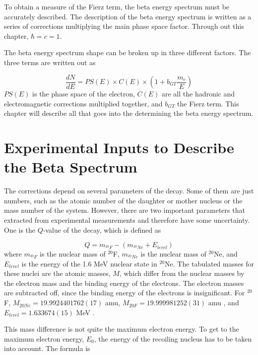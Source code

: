 \documentclass[../MaxHughesThesis.tex]{subfiles}
\begin{document}
To obtain a measure of the Fierz term, the beta energy spectrum must be accurately described.
The description of the beta energy spectrum is written as a series of corrections multiplying the main phase space factor.  
Through out this chapter, $\hbar = c = 1$.

The beta energy spectrum shape can be broken up in three different factors. 
The three terms are written out as  %

\begin{equation}
	\frac{dN}{dE} = PS(E) \times C(E) \times (1 + b_{GT}\frac{m_{e}}{E})
	\label{eq:betaspectrum}
\end{equation}
$PS(E)$ is the phase space of the electron, $C(E)$ are all the hadronic and electromagnetic corrections multiplied together, and $b_{GT}$ the Fierz term.
This chapter will describe all that goes into the determining the beta energy spectrum.

\section{Experimental Inputs to Describe the Beta Spectrum}
The corrections depend on several parameters of the decay. 
Some of them are just numbers, such as the atomic number of the daughter or mother nucleus or the mass number of the system.
However, there are two important parameters that extracted from experimental measurements and therefore have some uncertainty.
One is the $Q$-value of the decay, which is defined as %

\begin{equation}
	Q = m_{^{20}F} - (m_{^{20}Ne} + E_{level})
	\label{eq:qval}
\end{equation} 
where $m_{^{20}F}$ is the nuclear mass of $^{20}$F, $m_{^{20}Ne}$ is the nuclear mass of $^{20}$Ne, and $E_{level}$ is the energy of the 1.6 MeV nuclear state in $^{20}$Ne. 
The tabulated masses for these nuclei are the atomic masses, $M$, which differ from the nuclear masses by the electron mass and the binding energy of the electrons.
The electron masses are subtracted off, since the binding energy of the electrons is insignificant.
For $^{20}$F, $M_{20Ne} = 19.9924401762 (17)$ amu, $M_{20F} = 19.999981252 (31) $ amu \cite{Wan17} , and $E_{level} = 1.633674 (15)$ MeV  \cite{Til98} .

This mass difference is not quite the maximum electron energy. 
To get to the maximum electron energy, $E_{0}$, the energy of the recoiling nucleus has to be taken into account.
The formula is \cite{Hol74}%
\end{document}
